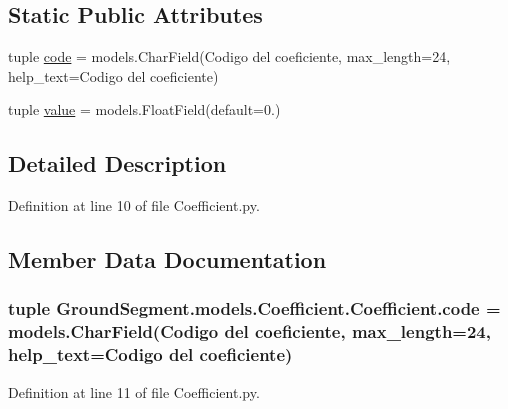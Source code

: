 \subsection*{Static Public Attributes}
\begin{DoxyCompactItemize}
\item 
tuple \hyperlink{class_ground_segment_1_1models_1_1_coefficient_1_1_coefficient_a322f1fea203fbc9aeddb7413cbfedb89}{code} = models.\+Char\+Field(\textquotesingle{}Codigo del coeficiente\textquotesingle{}, max\+\_\+length=24, help\+\_\+text=\textquotesingle{}Codigo del coeficiente\textquotesingle{})
\item 
tuple \hyperlink{class_ground_segment_1_1models_1_1_coefficient_1_1_coefficient_a47f7b36c3eb57045d7d2396d9515fbc6}{value} = models.\+Float\+Field(default=0.)
\end{DoxyCompactItemize}


\subsection{Detailed Description}


Definition at line 10 of file Coefficient.\+py.



\subsection{Member Data Documentation}
\hypertarget{class_ground_segment_1_1models_1_1_coefficient_1_1_coefficient_a322f1fea203fbc9aeddb7413cbfedb89}{}
\subsubsection[{code}]{\setlength{\rightskip}{0pt plus 5cm}tuple Ground\+Segment.\+models.\+Coefficient.\+Coefficient.\+code = models.\+Char\+Field(\textquotesingle{}Codigo del coeficiente\textquotesingle{}, max\+\_\+length=24, help\+\_\+text=\textquotesingle{}Codigo del coeficiente\textquotesingle{})\hspace{0.3cm}{\ttfamily [static]}}\label{class_ground_segment_1_1models_1_1_coefficient_1_1_coefficient_a322f1fea203fbc9aeddb7413cbfedb89}


Definition at line 11 of file Coefficient.\+py.

